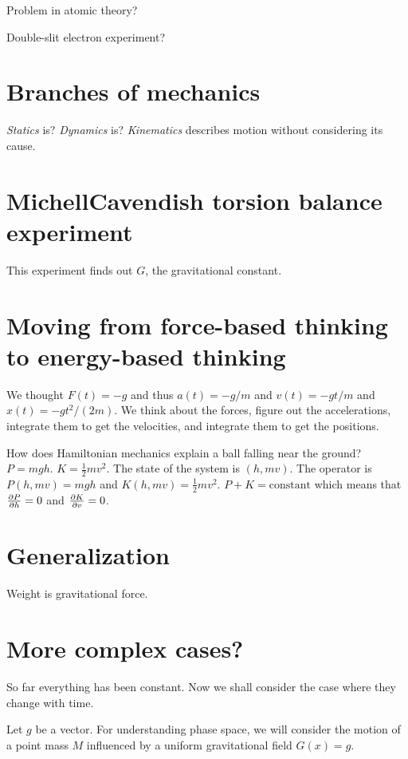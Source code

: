 Problem in atomic theory?

Double-slit electron experiment?

\section{Branches of mechanics}

\emph{Statics} is?
\emph{Dynamics} is?
\emph{Kinematics} describes motion without considering its cause.

\section{Michell\textendash{}Cavendish torsion balance experiment}

This experiment finds out \(G\), the gravitational constant.

\section{Moving from force-based thinking to energy-based thinking}

We thought \( F(t) = -g \) and thus \( a(t) = -g/m \) and \( v(t) = - gt / m \) and \( x(t) = - gt^2 / (2m) \).
We think about the forces,
figure out the accelerations,
integrate them to get the velocities,
and integrate them to get the positions.

How does Hamiltonian mechanics explain a ball falling near the ground?
\( P = mgh \).
\( K = \frac{1}{2}mv^2 \).
The state of the system is \( (h, mv) \).
The operator is \( P(h, mv) = mgh \) and \( K(h, mv) = \frac{1}{2}mv^2 \).
\( P + K = \text{constant} \) which means that \( \pdv{P}{h} = 0 \) and \( \pdv{K}{v} = 0 \).

\section{Generalization}

Weight is gravitational force.

\section{More complex cases?}

So far everything has been constant.
Now we shall consider the case where they change with time.

Let \(g\) be a vector.
For understanding phase space, we will consider
the motion of a point mass \(M\) influenced by a uniform gravitational field \( G(x) = g \).

